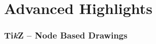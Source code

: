 \section{Advanced Highlights}
\begin{frame}
    \frametitle{Ti\textit{k}Z -- Node Based Drawings}
\end{frame}
\begin{frame}
    \frametitle{}
\end{frame}